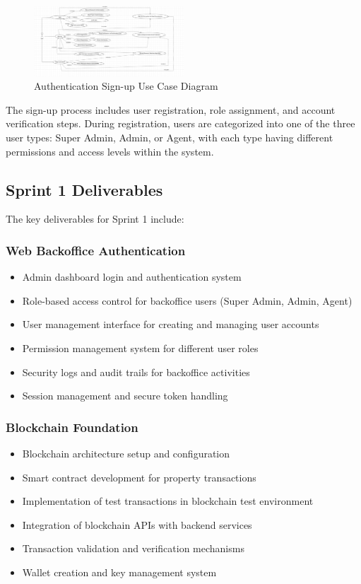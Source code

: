 \begin{figure}[htbp]
    \centering
    \includegraphics[width=0.5\textwidth]{images/diagram de case d utilisation signup.png}
    \vspace{1cm}
    \caption{Authentication Sign-up Use Case Diagram}
    \label{fig:signup-diagram}
\end{figure}
\vspace{3cm}
The sign-up process includes user registration, role assignment, and account verification steps. During registration, users are categorized into one of the three user types: Super Admin, Admin, or Agent, with each type having different permissions and access levels within the system.

\subsection{Sprint 1 Deliverables}
The key deliverables for Sprint 1 include:

\subsubsection{Web Backoffice Authentication}
\begin{itemize}
    \item Admin dashboard login and authentication system
    \item Role-based access control for backoffice users (Super Admin, Admin, Agent)
    \item User management interface for creating and managing user accounts
    \item Permission management system for different user roles
    \item Security logs and audit trails for backoffice activities
    \item Session management and secure token handling
\end{itemize}
\subsubsection{Blockchain Foundation}
\begin{itemize}
    \item Blockchain architecture setup and configuration
    \item Smart contract development for property transactions
    \item Implementation of test transactions in blockchain test environment
    \item Integration of blockchain APIs with backend services
    \item Transaction validation and verification mechanisms
    \item Wallet creation and key management system
\end{itemize}

